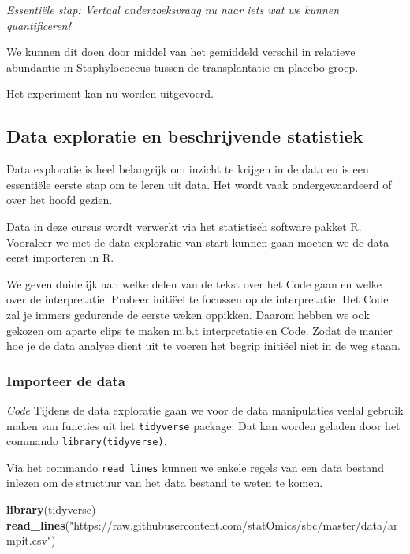 \documentclass[
  12pt,dutch]{book}
\newenvironment{Shaded}{\begin{snugshade}}{\end{snugshade}}
\newcommand{\FunctionTok}[1]{\textcolor[rgb]{0.13,0.29,0.53}{\textbf{#1}}}
\newcommand{\NormalTok}[1]{#1}
\newcommand{\StringTok}[1]{\textcolor[rgb]{0.31,0.60,0.02}{#1}}
\theoremstyle{definition}
\theoremstyle{definition}
\theoremstyle{definition}
\theoremstyle{definition}
\theoremstyle{remark}
\begin{document}
\emph{Essentiële stap: Vertaal onderzoeksvraag nu naar iets wat we kunnen quantificeren!}

We kunnen dit doen door middel van het gemiddeld verschil in relatieve abundantie in Staphylococcus tussen de transplantatie en placebo groep.

Het experiment kan nu worden uitgevoerd.

\subsection{Data exploratie en beschrijvende statistiek}\label{data-exploratie-en-beschrijvende-statistiek}

Data exploratie is heel belangrijk om inzicht te krijgen in de data en is een essentiële eerste stap om te leren uit data.
Het wordt vaak ondergewaardeerd of over het hoofd gezien.

Data in deze cursus wordt verwerkt via het statistisch software pakket R.
Vooraleer we met de data exploratie van start kunnen gaan moeten we de data eerst importeren in R.

We geven duidelijk aan welke delen van de tekst over het Code gaan en welke over de interpretatie. Probeer initiëel te focussen op de interpretatie. Het Code zal je immers gedurende de eerste weken oppikken. Daarom hebben we ook gekozen om aparte clips te maken m.b.t interpretatie en Code. Zodat de manier hoe je de data analyse dient uit te voeren het begrip initiëel niet in de weg staan.

\subsubsection{Importeer de data}\label{importeer-de-data}

\emph{Code} Tijdens de data exploratie gaan we voor de data manipulaties veelal gebruik maken van functies uit het \texttt{tidyverse} package.
Dat kan worden geladen door het commando
\texttt{library(tidyverse)}.

Via het commando \texttt{read\_lines} kunnen we enkele regels van een data bestand inlezen om de structuur van het data bestand te weten te komen.

\begin{Shaded}
\begin{Highlighting}[]
\FunctionTok{library}\NormalTok{(tidyverse)}
\FunctionTok{read\_lines}\NormalTok{(}\StringTok{"https://raw.githubusercontent.com/statOmics/sbc/master/data/armpit.csv"}\NormalTok{)}
\end{Highlighting}
\end{Shaded}
\end{document}
